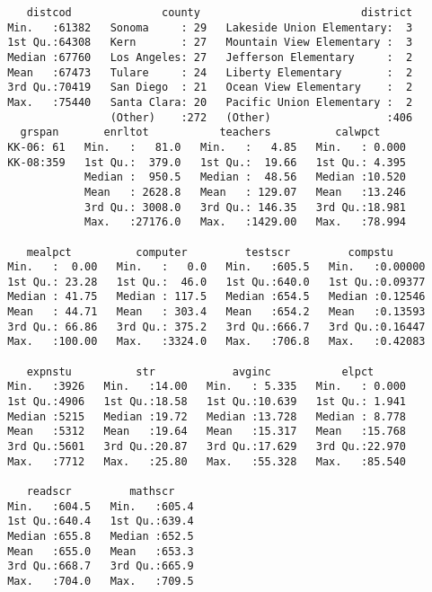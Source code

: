 \documentclass[12pt,]{article}
\begin{document}
\begin{verbatim}
    distcod              county                         district  
 Min.   :61382   Sonoma     : 29   Lakeside Union Elementary:  3  
 1st Qu.:64308   Kern       : 27   Mountain View Elementary :  3  
 Median :67760   Los Angeles: 27   Jefferson Elementary     :  2  
 Mean   :67473   Tulare     : 24   Liberty Elementary       :  2  
 3rd Qu.:70419   San Diego  : 21   Ocean View Elementary    :  2  
 Max.   :75440   Santa Clara: 20   Pacific Union Elementary :  2  
                 (Other)    :272   (Other)                  :406  
   grspan       enrltot           teachers          calwpct      
 KK-06: 61   Min.   :   81.0   Min.   :   4.85   Min.   : 0.000  
 KK-08:359   1st Qu.:  379.0   1st Qu.:  19.66   1st Qu.: 4.395  
             Median :  950.5   Median :  48.56   Median :10.520  
             Mean   : 2628.8   Mean   : 129.07   Mean   :13.246  
             3rd Qu.: 3008.0   3rd Qu.: 146.35   3rd Qu.:18.981  
             Max.   :27176.0   Max.   :1429.00   Max.   :78.994  
                                                                 
    mealpct          computer         testscr         compstu       
 Min.   :  0.00   Min.   :   0.0   Min.   :605.5   Min.   :0.00000  
 1st Qu.: 23.28   1st Qu.:  46.0   1st Qu.:640.0   1st Qu.:0.09377  
 Median : 41.75   Median : 117.5   Median :654.5   Median :0.12546  
 Mean   : 44.71   Mean   : 303.4   Mean   :654.2   Mean   :0.13593  
 3rd Qu.: 66.86   3rd Qu.: 375.2   3rd Qu.:666.7   3rd Qu.:0.16447  
 Max.   :100.00   Max.   :3324.0   Max.   :706.8   Max.   :0.42083  
                                                                    
    expnstu          str            avginc           elpct       
 Min.   :3926   Min.   :14.00   Min.   : 5.335   Min.   : 0.000  
 1st Qu.:4906   1st Qu.:18.58   1st Qu.:10.639   1st Qu.: 1.941  
 Median :5215   Median :19.72   Median :13.728   Median : 8.778  
 Mean   :5312   Mean   :19.64   Mean   :15.317   Mean   :15.768  
 3rd Qu.:5601   3rd Qu.:20.87   3rd Qu.:17.629   3rd Qu.:22.970  
 Max.   :7712   Max.   :25.80   Max.   :55.328   Max.   :85.540  
                                                                 
    readscr         mathscr     
 Min.   :604.5   Min.   :605.4  
 1st Qu.:640.4   1st Qu.:639.4  
 Median :655.8   Median :652.5  
 Mean   :655.0   Mean   :653.3  
 3rd Qu.:668.7   3rd Qu.:665.9  
 Max.   :704.0   Max.   :709.5  
                                
\end{verbatim}
\end{document}
